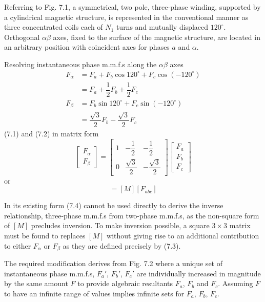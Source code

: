 \documentclass[a4paper,numbers=noenddot,12pt]{scrbook}
\begin{document}
Referring to Fig. 7.1, a symmetrical, two pole, three-phase winding, supported by a cylindrical magnetic structure, is represented in the conventional manner as three concentrated coils each of $N_1$ turns and mutually displaced $120^{\circ}$. Orthogonal $\alpha \beta$ axes, fixed to the surface of the magnetic structure, are located in an arbitrary position with coincident axes for phases $a$ and $\alpha$.

Resolving instantaneous phase m.m.f.s along the $\alpha \beta$ axes 
\begin{align}
    F_{\alpha} & = F_a + F_b \cos 120^{\circ} + F_c \cos (-120^{\circ}) \nonumber \\
    & = F_a + \dfrac{1}{2} F_b + \dfrac{1}{2} F_c \\
    F_{\beta} & = F_b \sin 120^{\circ} + F_c \sin (-120^{\circ}) \nonumber \\
    & = \dfrac{\sqrt{3}}{2} F_b - \dfrac{\sqrt{3}}{2} F_c
    \label{eq:Eq7.2}
\end{align}
(7.1) and (7.2) in matrix form 
\begin{equation}
    \begin{bmatrix}
        F_{\alpha} \\ F_{\beta} 
    \end{bmatrix}
    =
    \begin{bmatrix}
        1 & - \dfrac{1}{2} & -\dfrac{1}{2} \\[2ex]
        0 & \dfrac{\sqrt{3}}{2} & - \dfrac{\sqrt{3}}{2}
    \end{bmatrix}
    \begin{bmatrix}
        F_a \\ F_b \\ F_c 
    \end{bmatrix}
    \label{eq:Eq7.3}
\end{equation}
or
\begin{equation}
    [F_{\alpha \beta}] = [M][F_{abc}]
    \label{eq:Eq7.4}
\end{equation}

In its existing form (7.4) cannot be used directly to derive the inverse relationship, three-phase m.m.f.s from two-phase m.m.f.s, as the non-square form of $[M]$ precludes inversion. To make inversion possible, a square $3 \times 3$ matrix must be found to replaces $[M]$ without giving rise to an additional contribution to either $F_{\alpha}$ or $F_{\beta}$ as they are defined precisely by (7.3).

The required modification derives from Fig. 7.2 where a unique set of instantaneous phase m.m.f.s, $F_a'$, $F_b'$, $F_c'$ are individually increased in magnitude by the same amount $F$ to provide algebraic resultants $F_a$, $F_b$ and $F_c$. Assuming $F$ to have an infinite range of values implies infinite sets for $F_a$, $F_b$, $F_c$.
\end{document}
